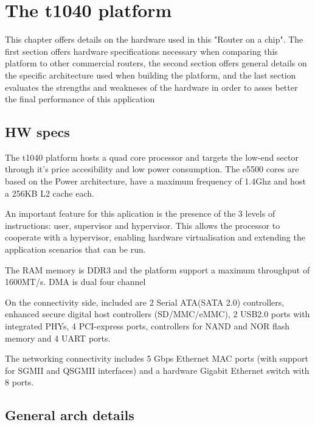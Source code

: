 \chapter{The t1040 platform}
\label{chapter:t1040-platform}

This chapter offers details on the hardware used in this "Router on a chip". The
first section offers hardware specifications necessary when comparing this
platform to other commercial routers, the second section offers general details
on the specific architecture used when building the platform, and the last
section evaluates the strengths and weakneses of the hardware in order to asses
better the final performance of this application


\section{HW specs}
\label{sec:specs}

The t1040 platform hosts a quad core processor and targets the low-end sector through
it's price accesibility and low power consumption. 
The e5500 cores are based on the Power architecture, have a maximum frequency of
1.4Ghz and host a 256KB L2 cache each. 

An important feature for this aplication
is the presence of the 3 levels of instructions: user, supervisor and
hypervisor. This allows the processor to cooperate with a hypervisor, enabling
hardware virtualisation and extending the application scenarios that can be run.

The RAM memory is DDR3 and the platform support a maximum throughput of
1600MT/s. DMA is dual four channel


On the connectivity side, included are 2 Serial ATA(SATA 2.0) controllers,
enhanced secure digital host controllers (SD/MMC/eMMC), 2 USB2.0 ports with integrated PHYs, 4
PCI-express ports, controllers for NAND and NOR flash memory and 4 UART ports.


The networking connectivity includes 5 Gbps Ethernet MAC ports (with support for
SGMII and QSGMII interfaces) and a hardware Gigabit Ethernet switch with 8 ports.


\section{General arch details}
\label{sub-sec:arch-details}

